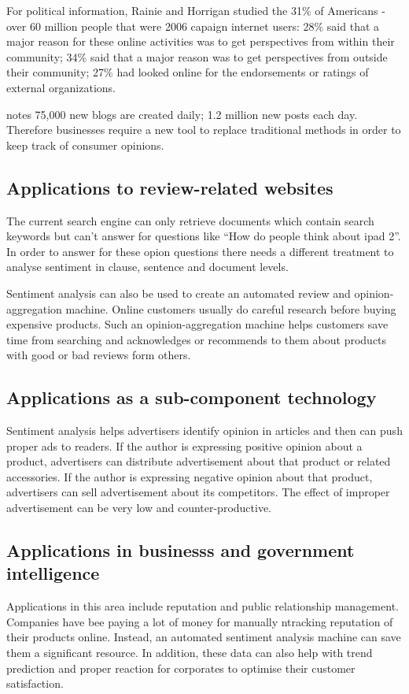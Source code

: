 \documentclass{article}
\begin{document}
\begin{multicols}{2}
    For political information, Rainie and Horrigan \citet{Rainie2007} studied 
the 31\% of Americans - over 60 million people that were 2006 capaign internet 
users: 28\% said that a major reason for these online activities was to
get perspectives from within their community; 34\% said that a major reason was 
to get perspectives from outside their community; 27\% had looked online for 
the endorsements or ratings of external organizations.
      
    \citet{ForrestWave2006} notes 75,000 new blogs are created daily; 1.2 million 
new posts each day. Therefore businesses require a new tool to replace traditional 
methods in order to keep track of consumer opinions.

    \subsection{Applications to review-related websites}
      The current search engine can only retrieve documents which contain search
keywords but can't answer for questions like ``How do people think about 
ipad 2''. In order to answer for these opion questions there needs a different 
treatment to analyse sentiment in clause, sentence and document levels. 

      Sentiment analysis can also be used to create an automated review and 
opinion-aggregation machine. Online customers usually do careful research before 
buying expensive products. Such an opinion-aggregation machine helps customers
save time from searching and acknowledges or recommends to them about products 
with good or bad reviews form others.

    \subsection{Applications as a sub-component technology}
        Sentiment analysis helps advertisers identify opinion in articles
and then can push proper ads to readers. If the author is expressing positive
opinion about a product, advertisers can distribute advertisement about that
product or related accessories. If the author is expressing negative opinion
about that product, advertisers can sell advertisement about its competitors.
The effect of improper advertisement can be very low and counter-productive.

    \subsection{Applications in businesss and government intelligence}
        Applications in this area include reputation and public 
relationship management. Companies have bee paying a lot of money for manually 
ntracking reputation of their products online. Instead, an automated sentiment 
analysis machine can save them a significant resource. In addition, these data
can also help with trend prediction and proper reaction for corporates to
optimise their customer satisfaction.


\end{multicols}
\end{document}

